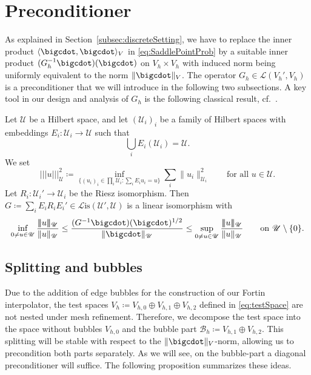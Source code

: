 \documentclass{amsart}
\newcommand{\nrm}{| \! | \! |}
\newcommand{\lnrm}{\mathopen{| \! | \! |}}
\newcommand{\rnrm}{\mathclose{| \! | \! |}}
\newcommand{\U}{\mathscr{U}}
\newcommand{\cL}{\mathcal L}
\newcommand{\Lis}{\cL\mathrm{is}}
\begin{document}
\section{Preconditioner}\label{sec:preCond}
As explained in Section~\ref{subsec:discreteSetting}, we have to replace the inner product $\langle \bigcdot , \bigcdot \rangle_V$ in \eqref{eq:SaddlePointProb} by a suitable inner product $(G_h^{-1}\bigcdot)(\bigcdot)$ on $V_h\times V_h$ with induced norm being uniformly equivalent to the norm $\lVert \bigcdot \rVert_V$. The operator $G_h\in \cL(V_h', V_h)$ is a preconditioner that we will introduce in the following two subsections. A key tool in our design and analysis of $G_h$ is the following classical result, cf.~\cite[Sec.~4.1]{Oswald94}.
\begin{theorem} \label{thm:1}
Let $\U$ be a Hilbert space, and let $(\U_i)_i$ be a family of Hilbert spaces with embeddings $ E_i\colon \U_i \rightarrow \U$ such that
\begin{equation*}
\bigcup_i E_i(\U_i)=\U.
\end{equation*}
We set
\begin{equation*}
\lnrm u\rnrm_\U^2 \coloneqq \inf_{\{(u_i)_{i} \in \prod_{i} \U_i\colon \sum_{i} E_i u_i=u\}} \textstyle{\sum_{i}} \|u_i\|^2_{\U_i}\qquad\text{for all }u\in \U.
\end{equation*}
Let $R_i\colon \U_i' \rightarrow \U_i$ be the Riesz isomorphism. Then
$G \coloneqq \sum_{i} E_i R_i E_i'\in \Lis(\U',\U)$ is a linear isomorphism with
\begin{equation*}
\inf_{0 \neq u \in \U} \frac{\nrm u\nrm_\U}{\|u\|_\U} \leq
\frac{(G^{-1}\bigcdot)(\bigcdot)^{1/2}}{\|\bigcdot\|_{\U}} \leq
\sup_{0 \neq u \in \U} \frac{\nrm u\nrm_\U}{\|u\|_\U} \qquad\text{on } \U\setminus \{0\}.
\end{equation*}
\end{theorem}
%
\subsection{Splitting and bubbles}\label{subsec:Splitting}
Due to the addition of edge bubbles for the construction of our Fortin interpolator, the test spaces $V_h \coloneqq V_{h,0} \oplus V_{h,1} \oplus V_{h,2}$ defined in \eqref{eq:testSpace} are not nested under mesh refinement. Therefore, we decompose the test space into the space without bubbles $V_{h,0}$ and the bubble part $\mathcal{B}_h\coloneqq  V_{h,1} \oplus V_{h,2}$. This splitting will be stable with respect to the $\|\bigcdot\|_V$-norm, allowing us to precondition both parts separately. 
As we will see, on the bubble-part a diagonal preconditioner will suffice. 
The following proposition summarizes these ideas.
\end{document}
